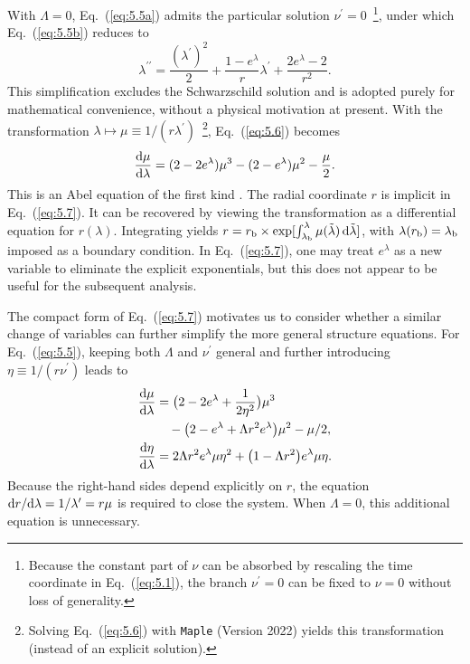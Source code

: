 \documentclass[aps,prd,twocolumn]{revtex4-2}
\newcommand\dx{{\rm d}}
\newcommand\subb{{\rm b}}
\begin{document}
With $\Lambda=0$, Eq.~(\ref{eq:5.5a}) admits the particular solution $\nu^\prime=0$~\footnote{Because the constant part of $\nu$ can be absorbed by rescaling the time coordinate in Eq.~(\ref{eq:5.1}), the branch $\nu^\prime=0$ can be fixed to $\nu=0$ without loss of generality.}, under which Eq.~(\ref{eq:5.5b}) reduces to
\begin{equation}\label{eq:5.6}
  \lambda^{\prime\prime} = \frac{(\lambda^\prime)^2}{2} + \frac{1-e^\lambda}{r}\lambda^\prime + \frac{2e^\lambda-2}{r^2}.
\end{equation}
This simplification excludes the Schwarzschild solution and is adopted purely for mathematical convenience, without a physical motivation at present. With the transformation $\lambda\mapsto\mu\equiv1/(r\lambda^\prime)$~\footnote{Solving Eq.~(\ref{eq:5.6}) with \texttt{Maple} (Version 2022) yields this transformation (instead of an explicit solution).}, Eq.~(\ref{eq:5.6}) becomes
\begin{equation}\label{eq:5.7}
  \frac{\dx\mu}{\dx\lambda} = (2-2e^\lambda)\mu^3-(2-e^\lambda)\mu^2-\frac{\mu}{2}.
\end{equation}
This is an Abel equation of the first kind \cite{Polyanin2018.book}. The radial coordinate $r$ is implicit in Eq.~(\ref{eq:5.7}). It can be recovered by viewing the transformation as a differential equation for $r(\lambda)$. Integrating yields $r=r_\subb\times\exp[\int_{\lambda_\subb}^\lambda\mu(\tilde{\lambda})\,\dx\tilde{\lambda}]$, with $\lambda(r_\subb)=\lambda_\subb$ imposed as a boundary condition. In Eq.~(\ref{eq:5.7}), one may treat $e^\lambda$ as a new variable to eliminate the explicit exponentials, but this does not appear to be useful for the subsequent analysis.

The compact form of Eq.~(\ref{eq:5.7}) motivates us to consider whether a similar change of variables can further simplify the more general structure equations. For Eq.~(\ref{eq:5.5}), keeping both $\Lambda$ and $\nu^\prime$ general and further introducing $\eta \equiv 1/(r\nu^\prime)$ leads to
\begin{subequations}\label{eq:5.8}
\begin{align}
  \frac{\dx\mu}{\dx\lambda} &= \big(2 - 2e^\lambda + \frac{1}{2\eta^2}\big)\mu^3 \nonumber\\
    &\quad - \big(2 - e^\lambda + \Lambda r^2e^\lambda\big)\mu^2 - \mu/2, \label{eq:5.8a}\\
  \frac{\dx\eta}{\dx\lambda} &= 2\Lambda r^2e^\lambda\mu\eta^2 + \big(1 - \Lambda r^2\big)e^\lambda\mu\eta. \label{eq:5.8b}
\end{align}
\end{subequations}
Because the right-hand sides depend explicitly on $r$, the equation $\dx r/\dx\lambda=1/\lambda^\prime=r\mu$ is required to close the system. When $\Lambda=0$, this additional equation is unnecessary.
\end{document}
